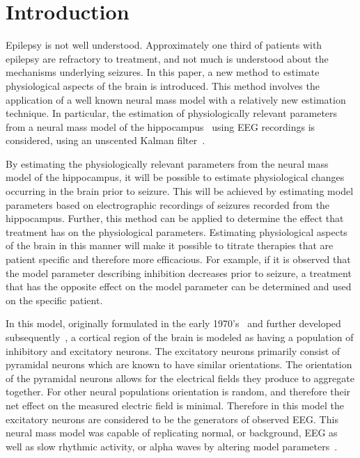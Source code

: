 \section{Introduction}


Epilepsy is not well understood. Approximately one third of patients with epilepsy are refractory to treatment, and not much is understood about the mechanisms underlying seizures. In this paper, a new method to estimate physiological aspects of the brain is introduced. This method involves the application of a well known neural mass model with a relatively new estimation technique. In particular, the estimation of physiologically relevant parameters from a neural mass model of the hippocampus~\citep{wendling2002epileptic} using EEG recordings is considered, using an unscented Kalman filter~\citep{voss2004nonlinear}. 

By estimating the physiologically relevant parameters from the neural mass model of the hippocampus, it will be possible to estimate physiological changes occurring in the brain prior to seizure. This will be achieved by estimating model parameters based on electrographic recordings of seizures recorded from the hippocampus. Further, this method can be applied to determine the effect that treatment has on the physiological parameters. Estimating physiological aspects of the brain in this manner will make it possible to titrate therapies that are patient specific and therefore more efficacious. For example, if it is observed that the model parameter describing inhibition decreases prior to seizure, a treatment that has the opposite effect on the model parameter can be determined and used on the specific patient.


In this model, originally formulated in the early 1970's~\citep{lopes1974model,freeman1963electrical} and further developed subsequently~\citep{jansen1995electroencephalogram}, a cortical region of the brain is modeled as having a population of inhibitory and excitatory neurons. The excitatory neurons primarily consist of pyramidal neurons which are known to have similar orientations. The orientation of the pyramidal neurons allows for the electrical fields they produce to aggregate together. For other neural populations orientation is random, and therefore their net effect on the measured electric field is minimal. Therefore in this model the excitatory neurons are considered to be the generators of observed EEG. This neural mass model was capable of replicating normal, or background, EEG as well as slow rhythmic activity, or alpha waves by altering model parameters~\citep{jansen1995electroencephalogram}.

